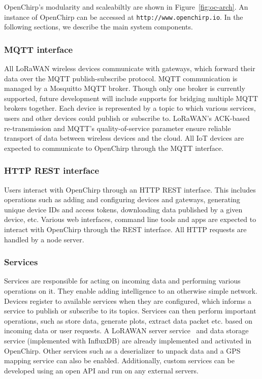 \documentclass[conference]{IEEEtran}
\newcommand{\figref}[1]{Figure~\ref{fig:#1}}
\begin{document}
OpenChirp's modularity and scaleabiltly are shown in \figref{oc-arch}.
An instance of OpenChirp can be accessed at \texttt{http://www.openchirp.io}.
In the following sections, we describe the main system components.


\subsubsection{MQTT interface}
All LoRaWAN wireless devices communicate with gateways, which forward their
data over the MQTT publish-subscribe protocol. MQTT communication is managed
by a Mosquitto MQTT broker. Though only one broker is currently supported,
future development will include supports for bridging multiple MQTT brokers
together. Each device is represented by a topic to which various services,
users and other devices could publish or subscribe to. LoRaWAN's ACK-based
re-transmission and MQTT's quality-of-service parameter ensure reliable
transport of data between wireless devices and the cloud. All IoT devices are
expected to communicate to OpenChirp through the MQTT interface.

\subsubsection{HTTP REST interface}

Users interact with OpenChirp through an HTTP REST interface. This
includes operations such as adding and configuring devices and
gateways, generating unique device IDs and access tokens, downloading data
published by a given device, etc. Various web interfaces, command line tools
and apps are expected to interact with OpenChirp through the REST interface.
All HTTP requests are handled by a node server.

\subsubsection{Services}

Services are responsible for acting on incoming data and performing various
operations on it. They enable adding intelligence to an otherwise simple
network. Devices register to available services when they are configured,
which informs a service to publish or subscribe to its topics. Services can
then perform important operations, such as store data, generate plots, extract data packet etc. based on incoming data or user requests. A LoRAWAN server
service~\cite{loraserver} and data storage service (implemented with InfluxDB)
are already implemented and activated in OpenChirp. Other services such as a
deserializer to unpack data and a GPS mapping service can also be enabled.
Additionally, custom services can be developed using an open API and run on
any external servers.
\end{document}

